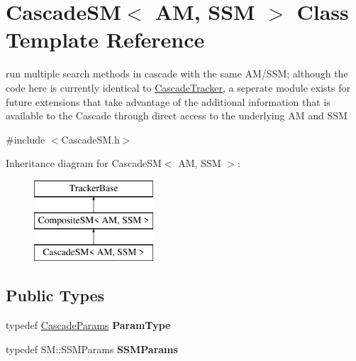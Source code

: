 \hypertarget{classCascadeSM}{\section{Cascade\-S\-M$<$ A\-M, S\-S\-M $>$ Class Template Reference}
\label{classCascadeSM}
}


run multiple search methods in cascade with the same A\-M/\-S\-S\-M; although the code here is currently identical to \hyperlink{classCascadeTracker}{Cascade\-Tracker}, a seperate module exists for future extensions that take advantage of the additional information that is available to the Cascade through direct access to the underlying A\-M and S\-S\-M  




{\ttfamily \#include $<$Cascade\-S\-M.\-h$>$}

Inheritance diagram for Cascade\-S\-M$<$ A\-M, S\-S\-M $>$\-:\begin{figure}[H]
\begin{center}
\leavevmode
\includegraphics[height=3.000000cm]{classCascadeSM}
\end{center}
\end{figure}
\subsection*{Public Types}
\begin{DoxyCompactItemize}
\item 
\hypertarget{classCascadeSM_a2160669d0a3c681e6f6dd96daf67f3bc}{typedef \hyperlink{structCascadeParams}{Cascade\-Params} {\bfseries Param\-Type}}\label{classCascadeSM_a2160669d0a3c681e6f6dd96daf67f3bc}

\item 
\hypertarget{classCascadeSM_a5c5b6836ce4813905865b7e2b6abc034}{typedef S\-M\-::\-S\-S\-M\-Params {\bfseries S\-S\-M\-Params}}\label{classCascadeSM_a5c5b6836ce4813905865b7e2b6abc034}

\end{DoxyCompactItemize}
